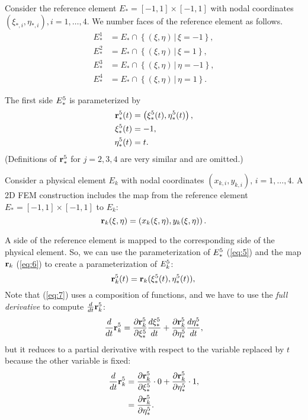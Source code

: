 \documentclass[11pt]{article}
\begin{document}
Consider the reference element $E_{*} = [-1, 1] \times [-1,1]$ with nodal coordinates
$(\xi_{*,i}, \eta_{*,i}), i=1,\dots,4$.
We number faces of the reference element as follows.
\begin{equation}
\label{eq:4}
\begin{aligned}
E_{*}^{1} &=  E_{*} \cap \left \{ (\xi, \eta)\, |\, \xi = -1 \right \},\\
E_{*}^{2} &=  E_{*} \cap \left \{ (\xi, \eta)\, |\, \xi = 1  \right \},\\
E_{*}^{3} &=  E_{*} \cap \left \{ (\xi, \eta)\, |\, \eta = -1 \right \},\\
E_{*}^{4} &=  E_{*} \cap \left \{ (\xi, \eta)\, |\, \eta = 1  \right \}.
\end{aligned}
\end{equation}

The first side $E_{*}^{5}$ is parameterized by
\begin{equation}
  \label{eq:5}
  \begin{aligned}
      \mathbf{r}_{*}^{5}(t) &= \left(\xi_{*}^{5}(t), \eta_{*}^{5}(t) \right),\\
      \xi_{*}^{5}(t) &= -1,\\
      \eta_{*}^{5}(t) &= t.
  \end{aligned}
\end{equation}
(Definitions of $\mathbf{r}_{*}^{5}$ for $j = 2, 3, 4$ are very similar and
are omitted.)

Consider a physical element $E_{k}$ with nodal coordinates $(x_{k,i}, y_{k,i}),\, i = 1,\dots,4$.
A 2D FEM construction includes the map from the reference element
$E_{*} = [-1, 1] \times [-1,1]$ to $E_{k}$:
\begin{equation}
\label{eq:6}
\mathbf{r}_{k}(\xi,\eta) = \left( x_{k}(\xi,\eta), y_{k}(\xi,\eta) \right).
\end{equation}

A side of the reference element is mapped to the corresponding side of
the physical element. So, we can use the parameterization of
$E_{*}^{5}$ (\ref{eq:5}) and the map $\mathbf{r}_{k}$ (\ref{eq:6}) to create a parameterization of
$E_{k}^{5}$:
\begin{equation}
  \label{eq:7}
  \mathbf{r}_{k}^{5}(t) = \mathbf{r}_{k}(\xi_{*}^{5}(t), \eta_{*}^{5}(t)),\\
\end{equation}
Note that (\ref{eq:7}) uses a composition of functions, and we have to
use the \emph{full derivative} to compute $\frac{d}{dt}\mathbf{r}_{k}^{5}$:
\begin{equation}
  \label{eq:8}
  \frac{d }{d t}\mathbf{r}_{k}^{5} = \frac{\partial \mathbf{r}_{k}^{5}}{\partial \xi_{*}^{5}} \frac{d \xi_{*}^{5}}{d t} + \frac{\partial \mathbf{r}_{k}^{5}}{\partial \eta_{*}^{5}} \frac{d \eta_{*}^{5}}{d t},
\end{equation}
but it reduces to a partial derivative with respect to the variable
replaced by $t$ because the other variable is fixed:
\begin{equation}
  \label{eq:9}
  \begin{aligned}
  \frac{d }{d t}\mathbf{r}_{k}^{5} &= \frac{\partial \mathbf{r}_{k}^{5}}{\partial \xi_{*}^{5}}\cdot 0 + \frac{\partial \mathbf{r}_{k}^{5}}{\partial \eta_{*}^{5}} \cdot 1,\\
    &=\frac{\partial \mathbf{r}_{k}^{5}}{\partial \eta_{*}^{5}}.
  \end{aligned}
\end{equation}
\end{document}
